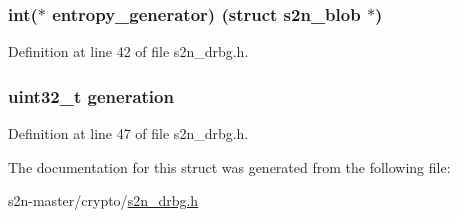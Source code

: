 \subsubsection[{\texorpdfstring{entropy\+\_\+generator}{entropy_generator}}]{\setlength{\rightskip}{0pt plus 5cm}int($\ast$ entropy\+\_\+generator) (struct {\bf s2n\+\_\+blob} $\ast$)}\hypertarget{structs2n__drbg_a1da47f15436224ab1f799cf4869471e2}{}\label{structs2n__drbg_a1da47f15436224ab1f799cf4869471e2}


Definition at line 42 of file s2n\+\_\+drbg.\+h.

\subsubsection[{\texorpdfstring{generation}{generation}}]{\setlength{\rightskip}{0pt plus 5cm}uint32\+\_\+t generation}\hypertarget{structs2n__drbg_a240945185669680bcfcd13289bd5376a}{}\label{structs2n__drbg_a240945185669680bcfcd13289bd5376a}


Definition at line 47 of file s2n\+\_\+drbg.\+h.



The documentation for this struct was generated from the following file\+:\begin{DoxyCompactItemize}
\item 
s2n-\/master/crypto/\hyperlink{s2n__drbg_8h}{s2n\+\_\+drbg.\+h}\end{DoxyCompactItemize}

